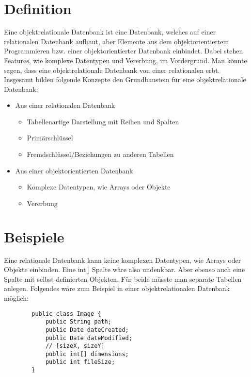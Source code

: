 \documentclass[twocolumn]{article}
\begin{document}
    \maketitle

    \section{Definition}
    Eine objektrelationale Datenbank ist eine Datenbank, welches auf einer relationalen Datenbank aufbaut, aber Elemente aus dem objektorientiertem Programmieren bzw. einer objektorientierter Datenbank einbindet. Dabei stehen Features, wie
    komplexe Datentypen und Vererbung, im Vordergrund. Man könnte sagen, dass eine objektrelationale Datenbank von einer relationalen erbt. Insgesamt bilden folgende Konzepte den Grundbaustein für eine objektrelationale Datenbank:

    \begin{itemize}
        \item Aus einer relationalen Datenbank
        \begin{itemize}
            \item Tabellenartige Darstellung mit Reihen und Spalten
            \item Primärschlüssel
            \item Fremdschlüssel/Beziehungen zu anderen Tabellen
        \end{itemize}
        \item Aus einer objektorientierten Datenbank
        \begin{itemize}
            \item Komplexe Datentypen, wie Arrays oder Objekte
            \item Vererbung
        \end{itemize}
    \end{itemize}

    \section{Beispiele}
    Eine relationale Datenbank kann keine komplexen Datentypen, wie Arrays oder Objekte einbinden. Eine int[] Spalte wäre also undenkbar. Aber ebenso auch eine Spalte mit selbst-definierten Objekten. Für beide müsste man separate Tabellen anlegen. Folgendes wäre zum Beispiel in einer objektrelationalen Datenbank möglich:

    \begin{verbatim}
        public class Image {
            public String path;
            public Date dateCreated;
            public Date dateModified;
            // [sizeX, sizeY]
            public int[] dimensions;
            public int fileSize;
        }
    \end{verbatim}
\end{document}
